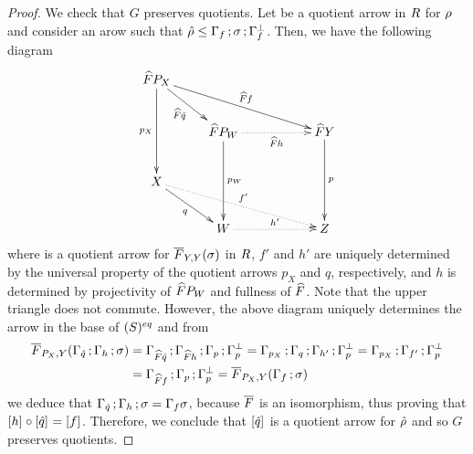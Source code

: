 \begin{proof}
We check that $G$ preserves quotients. 
Let  be a quotient arrow in $R$ for $\rho$ and consider an arow  such that 
$\hat{\rho} \leq \Gamma_{f}\mathop{\mathbf{;}}\sigma\mathop{\mathbf{;}}\Gamma_{f}^{\bot}$. 
Then, we have the following diagram 
\[\xymatrix{
  \fn{F}P_X 
  \ar[rrrd]^-{\fn{F}f} 
  \ar[rd]_-{\fn{F}\hat q} 
  \ar[dd]_-{p_X} 
\\
& \fn{F}P_W 
  \ar@{..>}[rr]_-{\fn{F} h} 
  \ar[dd]^-{p_W} 
& 
& \fn{F}Y 
  \ar[dd]^-{p} 
\\ 
  X 
  \ar@{..>}[rrrd]^-{f'} 
  \ar[rd]_-{q} 
\\
& W 
  \ar@{..>}[rr]^-{h'} 
&
& Z 
}\]
where  is a quotient arrow for $\overline{F}_{Y,Y}(\sigma)$ in $R$, 
$f'$ and $h'$ are uniquely determined by the universal property of the quotient arrows $p_X$ and $q$, respectively, 
and $h$ is determined by projectivity of $\widehat{F}P_W$ and fullness of $\widehat{F}$. 
Note that the upper triangle does not commute. 
However, the above diagram uniquely determines the arrow  in the base of $(S)^{eq}$ and from 
\begin{align*} 
\overline{F}_{P_X,Y}(\Gamma_{\hat q}\mathop{\mathbf{;}}\Gamma_{h}\mathop{\mathbf{;}}\sigma) 
  & = \Gamma_{\widehat{F}\hat q}\mathop{\mathbf{;}}\Gamma_{\widehat{F}h}\mathop{\mathbf{;}}\Gamma_{p}\mathop{\mathbf{;}}\Gamma_{p}^{\bot} 
    = \Gamma_{p_X}\mathop{\mathbf{;}}\Gamma_{q}\mathop{\mathbf{;}}\Gamma_{h'}\mathop{\mathbf{;}}\Gamma_{p}^{\bot} 
    = \Gamma_{p_X}\mathop{\mathbf{;}}\Gamma_{f'}\mathop{\mathbf{;}}\Gamma_{p}^{\bot}
\\
  & = \Gamma_{\widehat{F}f}\mathop{\mathbf{;}}\Gamma_{p}\mathop{\mathbf{;}}\Gamma_{p}^{\bot} 
    = \overline{F}_{P_X,Y}(\Gamma_{f}\mathop{\mathbf{;}}\sigma) 
\end{align*} 
we deduce that $\Gamma_{\hat q}\mathop{\mathbf{;}}\Gamma_{h}\mathop{\mathbf{;}}\sigma = \Gamma_{f}\sigma$, because $\overline{F}$ is an isomorphism, 
thus proving that $[h]_{}\circ[\hat q]_{} = [f]_{}$. 
Therefore, we conclude that $[\hat q]_{}$ is a quotient arrow for $\hat{\rho}$ and so $G$ preserves quotients. 


\end{proof}
